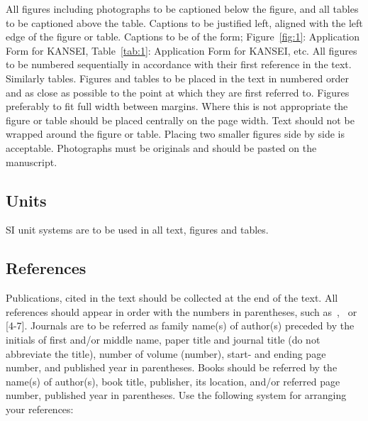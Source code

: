 \documentclass[a4paper,10pt,conference,compsoc]{ISASE}
\begin{document}
All figures including photographs to be captioned below the figure, and all
tables to be captioned above the table. Captions to be justified left, aligned
with the left edge of the figure or table. Captions to be of the form;
Figure~\ref{fig:1}: Application Form for KANSEI, Table~\ref{tab:1}: Application
Form for KANSEI, etc. All figures to be numbered sequentially in accordance
with their first reference in the text. Similarly tables. Figures and tables to
be placed in the text in numbered order and as close as possible to the point
at which they are first referred to. Figures preferably to fit full width
between margins. Where this is not appropriate the figure or table should be
placed centrally on the page width. Text should not be wrapped around the
figure or table. Placing two smaller figures side by side is acceptable.
Photographs must be originals and should be pasted on the manuscript.

\subsection{Units}

SI unit systems are to be used in all text, figures and tables.

\subsection{References}

Publications, cited in the text should be collected at the end of the text. All
references should appear in order with the numbers in parentheses, such
as~\cite{ninomiya1988},~\cite{kawasima1996, kato2000} or [4-7]. Journals are to
be referred as family name(s) of author(s) preceded by the initials of first
and/or middle name, paper title and journal title (do not abbreviate the
title), number of volume (number), start- and ending page number, and published
year in parentheses. Books should be referred by the name(s) of author(s), book
title, publisher, its location, and/or referred page number, published year in
parentheses. Use the following system for arranging your references:
\end{document}
